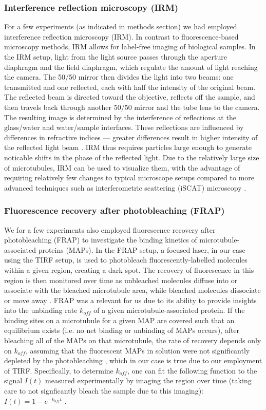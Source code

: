 \subsubsection{Interference reflection microscopy (IRM)}
For a few experiments (as indicated in methods section) we had employed interference reflection microscopy (IRM). In contrast to fluorescence-based microscopy methods, IRM allows for label-free imaging of biological samples. In the IRM setup, light from the light source passes through the aperture diaphragm and the field diaphragm, which regulate the amount of light reaching the camera. The 50/50 mirror then divides the light into two beams: one transmitted and one reflected, each with half the intensity of the original beam. The reflected beam is directed toward the objective, reflects off the sample, and then travels back through another 50/50 mirror and the tube lens to the camera. The resulting image is determined by the interference of reflections at the glass/water and water/sample interfaces. These reflections are influenced by differences in refractive indices — greater differences result in higher intensity of the reflected light beam \parencite{barr2009interference}. IRM thus requires particles large enough to generate noticable shifts in the phase of the reflected light. Due to the relatively large size of microtubules, IRM can be used to visualize them, with the advantage of requiring relatively few changes to typical microscope setups compared to more advanced techniques such as interferometric scattering (iSCAT) microscopy \parencite{Mahamdeh2018}.

\subsubsection{Fluorescence recovery after photobleaching (FRAP)}
\label{sec:FRAP}
We for a few experiments also employed fluorescence recovery after photobleaching (FRAP) to investigate the binding kinetics of microtubule-associated proteins (MAPs). In the FRAP setup, a focused laser, in our case using the TIRF setup, is used to photobleach fluorescently-labelled molecules within a given region, creating a dark spot. The recovery of fluorescence in this region is then monitored over time as unbleached molecules diffuse into or associate with the bleached microtubule area, while bleached molecules dissociate or move away \parencite{axelrod1976mobility}. FRAP was a relevant for us due to its ability to provide insights into the unbinding rate $k_{off}$ of a given microtubule-associated protein. If the binding sites on a microtubule for a given MAP are covered such that an equilibrium exists (i.e. no net binding or unbinding of MAPs occurs), after bleaching all of the MAPs on that microtubule, the rate of recovery depends only on $k_{off}$, assuming that the fluorescent MAPs in solution were not significantly depleted by the photobleaching \parencite{bulinski2001rapid}, which in our case is true due to our employment of TIRF. Specifically, to determine $k_{off}$, one can fit the following function to the signal $I(t)$ measured experimentally by imaging the region over time (taking care to not signficantly bleach the sample due to this imaging): $I(t)=1-e^{-k_{off}t}$ \parencite{bulinski2001rapid}.

